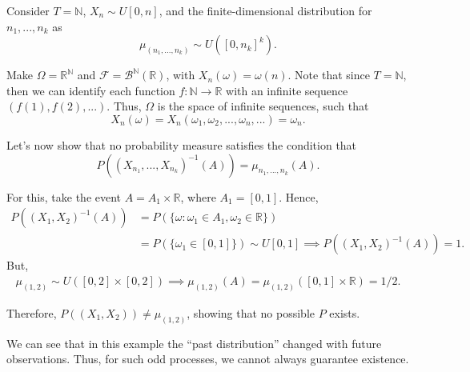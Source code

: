 \begin{example}

	Consider $T = \mathbb N$, $X_n \sim U[0,n]$,
	and the finite-dimensional distribution for $n_1,...,n_k$
	as
	\begin{displaymath}
		\mu_(n_1,...,n_k) \sim U([0,n_k]^k).
	\end{displaymath}

	Make $ \Omega = \mathbb R^\mathbb N$ and
	$\mathcal F = \mathcal B^\mathbb N(\mathbb R)$, with
	$X_n(\omega)=\omega(n)$.
	Note that since $T = \mathbb N$, then we can identify each
	function $f:\mathbb N \to \mathbb R$ with an infinite sequence $(f(1),f(2),...)$.
	Thus, $\Omega$ is the space of infinite sequences, such that
	\begin{displaymath}
		X_n(\omega) = X_n(\omega_1,\omega_2,...,\omega_n,...) = \omega_n.
	\end{displaymath}

	Let's now show that no probability measure satisfies the condition that
	\begin{displaymath}
		P((X_{n_1},...,X_{n_k})^{-1}(A)) = \mu_{n_1,...,n_k}(A).
	\end{displaymath}

	For this, take the event $A = A_1 \times \mathbb R$, where $A_1 = [0,1]$. Hence,
	\begin{align*}
		P((X_1, X_2)^{-1}(A)) & = P(\{\omega: \omega_1 \in A_1, \omega_2 \in \mathbb R\}) \\
		                      & = P(\{\omega_1 \in [0,1]\}) \sim U[0,1]\implies
		P((X_1, X_2)^{-1}(A)) = 1.
	\end{align*}
	But,
	\begin{align*}
		\mu_{(1,2)}\sim U([0,2] \times [0,2]) \implies  \mu_{(1,2)}(A) =
		\mu_{(1,2)}([0,1]\times \mathbb R) = 1/2.
	\end{align*}

	Therefore, $P((X_1, X_2)) \neq \mu_{(1,2)}$, showing that no possible $P$ exists.

\end{example}

We can see that in this example the ``past distribution'' changed with future observations.
Thus, for such odd processes, we cannot always guarantee existence.

